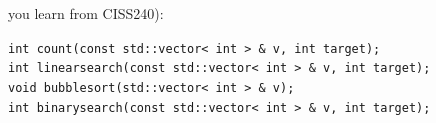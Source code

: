 you learn from CISS240):



\verb!int count(const std::vector< int > & v, int target);!\\

\verb!int linearsearch(const std::vector< int > & v, int target);!\\

\verb!void bubblesort(std::vector< int > & v);!\\

\verb!int binarysearch(const std::vector< int > & v, int target);!\\



